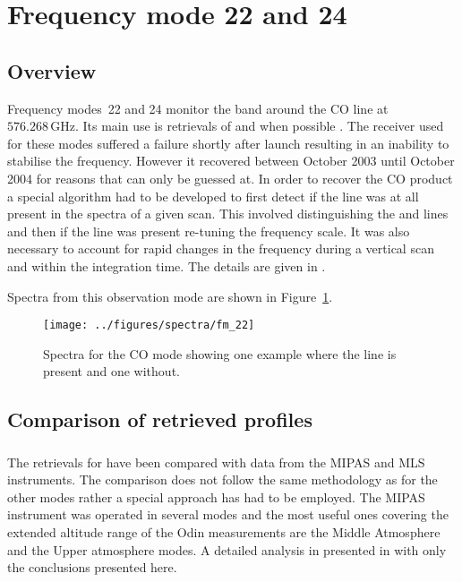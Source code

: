 \section{Frequency mode 22 and 24}
\label{sec:fm22}

\subsection{Overview}
\label{sec:fm22:overview}
Frequency modes~22 and 24 monitor the band around the CO line at $576.268 \,\mathrm{GHz}$. Its main use is retrievals of  and when possible . The receiver used for these modes suffered a failure shortly after launch resulting in an inability to stabilise the frequency. However it recovered between October 2003 until October 2004 for reasons that can only be guessed at. In order to recover the CO product a special algorithm had to be developed to first detect if the   line was at all present in the spectra of a given scan. This  involved distinguishing the   and  lines and then if the   line was present re-tuning the frequency scale.  It was also necessary to account for rapid changes in the frequency during a vertical scan and within the integration time.  The details are given in \cite{grieco2020a}.

Spectra from this observation mode are shown in Figure~\ref{fig:spectra:22}.

\begin{figure}[ht]
    \centering
    \texttt{[image: ../figures/spectra/fm\_22]}
    \caption{Spectra for the CO mode showing one example where the line is present and one without.
    }\label{fig:spectra:22}
\end{figure}


\subsection{Comparison of retrieved profiles}
\label{sec:fm22:comparison}



\subsubsection{}
\label{sec:fm22:comparison:CO}
The retrievals for  have been compared with data from the MIPAS and
MLS instruments.  The comparison does not follow the same methodology as for the other modes rather a special approach has had to be employed. 
The  MIPAS instrument was operated in several modes and the most useful ones covering the extended altitude range of the Odin measurements are the Middle Atmosphere and the Upper atmosphere modes.  A detailed analysis in presented in \cite{grieco2020a} with only the conclusions presented here.

